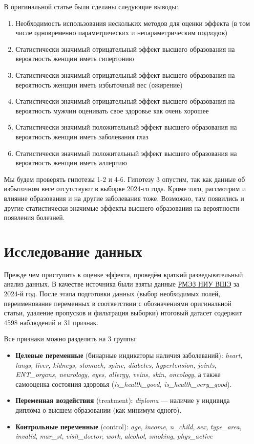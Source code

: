 \documentclass[a4paper,12pt]{article}
\begin{document}
В оригинальной статье были сделаны следующие выводы:
\begin{enumerate}
    \item Необходимость использования нескольких методов для оценки эффекта
          (в том числе одновременно параметрических и непараметрическим подходов)
    \item Статистически значимый отрицательный эффект высшего образования на вероятность женщин иметь гипертонию
    \item Статистически значимый отрицательный эффект высшего образования на вероятность женщин иметь избыточный вес (ожирение)
    \item Статистически значимый отрицательный эффект высшего образования на вероятность мужчин оценивать свое здоровье как очень хорошее
    \item Статистически значимый положительный эффект высшего образования на вероятность женщин иметь заболевания глаз
    \item Статистически значимый положительный эффект высшего образования на вероятность женщин иметь аллергию
\end{enumerate}

Мы будем проверять гипотезы 1-2 и 4-6. Гипотезу 3 опустим, так как данные об избыточном весе отсутствуют в выборке 2024-го года.
Кроме того, рассмотрим и влияние образования и на другие заболевания тоже.
Возможно, там появились и другие статистически значимые эффекты высшего образования на вероятности появления болезней. 

\section{Исследование данных}

Прежде чем приступить к оценке эффекта, проведём краткий разведывательный анализ данных.
В качестве источника были взяты данные \href{https://www.hse.ru/rlms/}{РМЭЗ НИУ ВШЭ} за 2024-й год.
После этапа подготовки данных (выбор необходимых полей, переименование переменных в соответствии с обозначениями оригинальной статьи, удаление пропусков и фильтрация выборки) итоговый датасет содержит 4598 наблюдений и 31 признак.

Все признаки можно разделить на 3 группы:
\begin{itemize}
    \item \textbf{Целевые переменные} (бинарные индикаторы наличия заболеваний): \textit{heart, lungs, liver, kidneys, stomach, spine, diabetes, hypertension, joints, ENT\_organs, neurology, eyes, allergy, veins, skin, oncology}, а также самооценка состояния здоровья (\textit{is\_health\_good, is\_health\_very\_good}).
    \item \textbf{Переменная воздействия} (treatment): \textit{diploma} --- наличие у индивида диплома о высшем образовании (как минимум одного).
    \item \textbf{Контрольные переменные} (control): \textit{age}, \textit{income}, \textit{n\_child}, \textit{sex}, \textit{type\_area}, \textit{invalid}, \textit{mar\_st}, \textit{visit\_doctor}, \textit{work}, \textit{alcohol}, \textit{smoking}, \textit{phys\_active}
\end{itemize}
\end{document}
